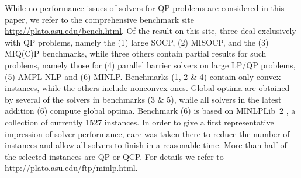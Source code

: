 While no performance issues of solvers for QP problems are considered in
this paper, we refer to the comprehensive benchmark site \url{http://plato.asu.edu/bench.html}. Of the result on this site, three deal exclusively with
QP problems, namely the (1) large SOCP, (2) MISOCP, and the (3) MIQ(C)P benchmarks, while three others contain partial results for such problems,
namely those for (4) parallel barrier solvers on large LP/QP problems, (5) AMPL-NLP and (6) MINLP.
Benchmarks (1, 2 \& 4) contain only convex instances, while the others
include nonconvex ones. Global optima are obtained by several of the solvers in
benchmarks (3 \& 5), while all solvers in the latest addition (6) compute
global optima.
Benchmark (6) is based on MINLPLib~2 \cite{Vigerske2014}, a
collection of currently 1527 instances. In order to give a first representative
impression of solver performance, care was taken there to reduce the number of
instances and allow all solvers to finish in a reasonable time.
More than half of the selected instances are QP or QCP.
For details we refer to \url{http://plato.asu.edu/ftp/minlp.html}.

